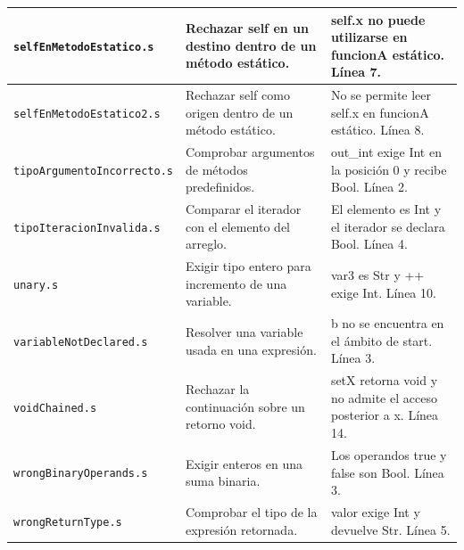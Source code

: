 \begin{longtable}{|>{\raggedright\arraybackslash}p{}|>{\raggedright\arraybackslash}p{}|>{\raggedright\arraybackslash}p{}|}
\texttt{self\allowbreak En\allowbreak Metodo\allowbreak Estatico.s} & Rechazar self en un destino dentro de un método estático. & self.x no puede utilizarse en funcionA estático. Línea 7. \\ \hline
\texttt{self\allowbreak En\allowbreak Metodo\allowbreak Estatico2.s} & Rechazar self como origen dentro de un método estático. & No se permite leer self.x en funcionA estático. Línea 8. \\ \hline
\texttt{tipo\allowbreak Argumento\allowbreak Incorrecto.s} & Comprobar argumentos de métodos predefinidos. & out\_int exige Int en la posición 0 y recibe Bool. Línea 2. \\ \hline
\texttt{tipo\allowbreak Iteracion\allowbreak Invalida.s} & Comparar el iterador con el elemento del arreglo. & El elemento es Int y el iterador se declara Bool. Línea 4. \\ \hline
\texttt{unary.s} & Exigir tipo entero para incremento de una variable. & var3 es Str y ++ exige Int. Línea 10. \\ \hline
\texttt{variable\allowbreak Not\allowbreak Declared.s} & Resolver una variable usada en una expresión. & b no se encuentra en el ámbito de start. Línea 3. \\ \hline
\texttt{void\allowbreak Chained.s} & Rechazar la continuación sobre un retorno void. & setX retorna void y no admite el acceso posterior a x. Línea 14. \\ \hline
\texttt{wrong\allowbreak Binary\allowbreak Operands.s} & Exigir enteros en una suma binaria. & Los operandos true y false son Bool. Línea 3. \\ \hline
\texttt{wrong\allowbreak Return\allowbreak Type.s} & Comprobar el tipo de la expresión retornada. & valor exige Int y devuelve Str. Línea 5. \\ \hline
\end{longtable}
\endgroup
